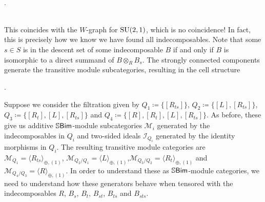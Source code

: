 \begin{example}
\begin{center}
\begin{tikzcd}[overlay, labels={outer sep=-1cm}, nodes={circle, minimum size=2.5cm, inner sep=-0.25cm, outer sep=-0.75cm}, cramped, column sep=-0.75cm, row sep=-0.75cm]
\end{tikzcd}
\end{center}
\begin{center}
\noindent\\[-2\linespacing]\qquad\qquad\qquad\qquad\qquad\qquad\qquad\qquad\qquad\qquad\qquad.
\end{center}
\noindent\\[5\linespacing] This coincides with the $W$-graph for $\textup{SU}(2, 1)$, which is no coincidence! In fact, this is precisely how we know we have found all indecomposables. Note that some $s \in S$ is in the descent set of some indecomposable $B$ if and only if $B$ is isomorphic to a direct summand of $B \otimes_R B_s$. The strongly connected components generate the transitive module subcategories, resulting in the cell structure\filbreak
\begin{center}
.
\end{center}
\noindent Suppose we consider the filtration given by $Q_1 \coloneqq \{[R_{ts}]\}$, $Q_2 \coloneqq \{[L], [R_{ts}]\}$, $Q_3 \coloneqq \{[R_t], [L], [R_{ts}]\}$ and $Q_4 \coloneqq \{[R], [R_t], [L], [R_{ts}]\}$. As before, these give us additive $\mathbb{S}\textcat{Bim}$-module subcategories $\mathcal{M}_i$ generated by the indecomposables in $Q_i$ and two-sided ideals $\mathcal{I}_{Q_i}$ generated by the identity morphisms in $Q_i$. The resulting transitive module categories are $\mathcal{M}_{Q_1} = \langle R_{ts} \rangle_{\oplus,(1)}$, $\mathcal{M}_{Q_2/Q_1} = \langle L\rangle_{\oplus,(1)}$,\linebreak $\mathcal{M}_{Q_3/Q_2} = \langle R_t \rangle_{\oplus,(1)}$ and $\mathcal{M}_{Q_4/Q_3} = \langle R \rangle_{\oplus,(1)}$. In order to understand these as $\mathbb{S}\textcat{Bim}$-module categories, we need to understand how these generators behave when tensored with the indecomposables $R$, $B_s$, $B_t$, $B_{st}$, $B_{ts}$ and $B_{sts}$.\\ %
\end{example}
\newpage

